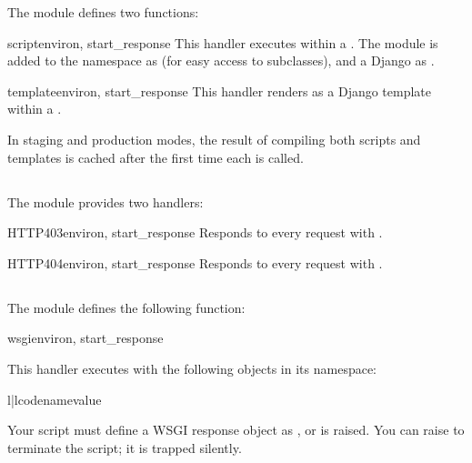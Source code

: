 The  module defines two functions:

\begin{funcdesc}{script}{environ, start_response} This handler executes
 within a . The
 module is added to the namespace as  (for easy
access to  subclasses), and a Django  as
. \end{funcdesc}

\begin{funcdesc}{template}{environ, start_response} This handler renders
 as a Django template within a .
\end{funcdesc}

In staging and production modes, the result of compiling both scripts and
templates is cached after the first time each is called.


\subsection{}
\label{api-handlers-http}

The  module provides two handlers:

\begin{funcdesc}{HTTP403}{environ, start_response}
Responds to every request with .
\end{funcdesc}

\begin{funcdesc}{HTTP404}{environ, start_response}
Responds to every request with .
\end{funcdesc}


\subsection{}
\label{api-handlers-pyscript}

The  module defines the following function:

\begin{funcdesc}{wsgi}{environ, start_response}

This handler executes  with the following
objects in its namespace:

\begin{tableii}{l|l}{code}{name}{value}
\end{tableii}

Your script must define a WSGI response object as , or
 is raised. You can raise  to terminate the
script; it is trapped silently.

\end{funcdesc}


